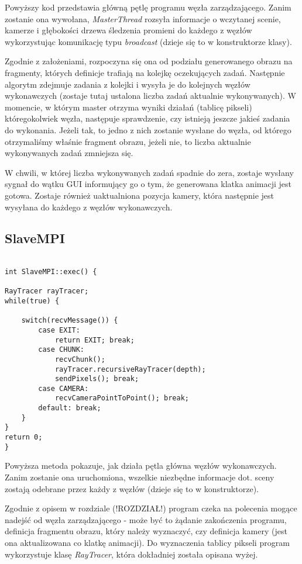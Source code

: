 Powyższy kod przedstawia główną pętlę programu węzła zarządzającego. Zanim zostanie ona wywołana, \emph{MasterThread} rozsyła informacje o wczytanej scenie, kamerze i głębokości drzewa śledzenia promieni do każdego z węzłów wykorzystując komunikację typu \emph{broadcast} (dzieje się to w konstruktorze klasy).

Zgodnie z założeniami, rozpoczyna się ona od podziału generowanego obrazu na fragmenty, których definicje trafiają na kolejkę oczekujących zadań. Następnie algorytm zdejmuje zadania z kolejki i wysyła je do kolejnych węzłów wykonawczych (zostaje tutaj ustalona liczba zadań aktualnie wykonywanych). W momencie, w którym master otrzyma wyniki działań (tablicę pikseli) któregokolwiek węzła, następuje sprawdzenie, czy istnieją jeszcze jakieś zadania do wykonania. Jeżeli tak, to jedno z nich zostanie wysłane do węzła, od którego otrzymaliśmy właśnie fragment obrazu, jeżeli nie, to liczba aktualnie wykonywanych zadań zmniejsza się.

W chwili, w której liczba wykonywanych zadań spadnie do zera, zostaje wysłany sygnał do wątku GUI informujący go o tym, że generowana klatka animacji jest gotowa. Zostaje również uaktualniona pozycja kamery, która następnie jest wysyłana do każdego z węzłów wykonawczych.

\subsection{SlaveMPI}

\begin{lstlisting}[caption={Fragment klasy \emph{SlaveMPI}}]

int SlaveMPI::exec() {

RayTracer rayTracer;
while(true) {

    switch(recvMessage()) {
        case EXIT:
            return EXIT; break;
        case CHUNK:
            recvChunk();
            rayTracer.recursiveRayTracer(depth);
            sendPixels(); break;
        case CAMERA:
            recvCameraPointToPoint(); break;
        default: break;
    }
}
return 0;
}

\end{lstlisting}


Powyższa metoda pokazuje, jak działa pętla główna węzłów wykonawczych. Zanim zostanie ona uruchomiona, wszelkie niezbędne informacje dot. sceny zostają odebrane przez każdy z węzłów (dzieje się to w konstruktorze). 

Zgodnie z opisem w rozdziale (!ROZDZIAŁ!) program czeka na polecenia mogące nadejść od węzła zarządzającego - może być to żądanie zakończenia programu, definicja fragmentu obrazu, który należy wyznaczyć, czy definicja kamery (jest ona aktualizowana co klatkę animacji). Do wyznaczenia tablicy pikseli program wykorzystuje klasę \emph{RayTracer}, która dokładniej została opisana wyżej. 

